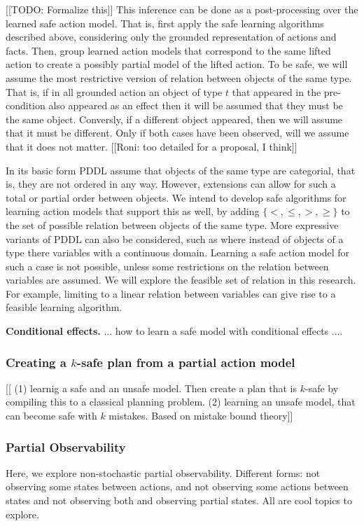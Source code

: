 \documentclass[12pt]{article}
\begin{document}
[[TODO: Formalize this]]
This inference can be done as a post-processing over the learned safe action model. 
That is, first apply the safe learning algorithms described above, considering only the grounded representation of actions and facts. Then, group learned action models that correspond to the same lifted action to create a possibly partial model of the lifted action. 
To be safe, we will assume the most restrictive version of relation between objects of the same type. 
That is, if in all grounded action an object of type $t$ that appeared in the pre-condition 
also appeared as an effect then it will be assumed that they must be the same object. 
Conversly, if a different object appeared, then we will assume that it must be different. 
Only if both cases have been observed, will we assume that it does not matter. 
[[Roni: too detailed for a proposal, I think]]


In its basic form PDDL assume that objects of the same type are categorial, that is, they are not ordered in any way. However, extensions can allow for such a total or partial order between objects. 
We intend to develop safe algorithms for learning action models that support this as well, 
by adding $\{<, \leq, >, \geq\}$ to the set of possible relation between objects of the same type. 
More expressive variants of PDDL can also be considered, such as where instead of objects of a type 
there variables with a continuous domain. Learning a safe action model for such a case is not possible,
unless some restrictions on the relation between variables are assumed. We will explore the feasible set of relation in this research. For example, limiting to a linear relation between variables can give rise to a feasible learning algorithm. 


{\bf Conditional effects.} ... how to learn a safe model with conditional effects ....


\subsubsection{Creating a $k$-safe plan from a partial action model}

[[ (1) learnig a safe and an unsafe model. Then create a plan that is $k$-safe by compiling this to a classical planning problem. (2) learning an unsafe model, that can become safe with $k$ mistakes. Based on mistake bound theory]]

\subsubsection{Partial Observability}
Here, we explore non-stochastic partial observability. 
Different forms: not observing some states between actions, 
and not observing some actions between states
and not observing both
and observing partial states. All are cool topics to explore.
\end{document}
